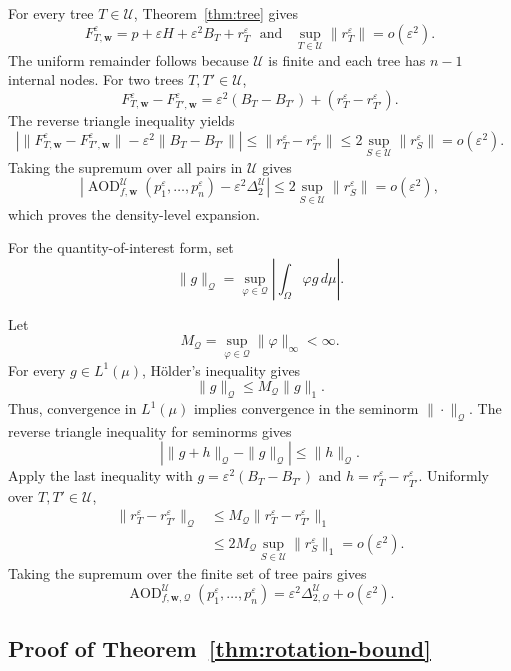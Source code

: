 \documentclass[11pt]{article}
\theoremstyle{plain}
\theoremstyle{definition}
\theoremstyle{definition}
\newcommand{\AOD}{\operatorname{AOD}}
\newcommand{\eps}{\varepsilon}
\newcommand{\QoI}{\mathcal Q}
\newcommand{\wv}{\mathbf w}
\newcommand{\Fw}[1]{F_{#1,\wv}^{\eps}}
\newcommand{\AODfw}{\AOD_{f,\wv}}
\newcommand{\AODfwQ}{\AOD_{f,\wv,\QoI}}
\begin{document}
For every tree $T\in\mathcal U$, Theorem~\ref{thm:tree} gives
\[
\Fw{T}=p+\eps H+\eps^2B_T+r_T^\eps \,\,\,\,\text{and}\,\,\,\,\,
\sup_{T\in\mathcal U}\|r_T^\eps\|=o(\eps^2).
\]
The uniform remainder follows because $\mathcal U$ is finite and each tree has $n-1$ internal nodes. For two trees $T,T'\in\mathcal U$,
\[
\Fw{T}-\Fw{T'}=\eps^2(B_T-B_{T'})+(r_T^\eps-r_{T'}^\eps).
\]
The reverse triangle inequality yields
\[
\left|\|\Fw{T}-\Fw{T'}\|-\eps^2\|B_T-B_{T'}\|\right|
\le \|r_T^\eps-r_{T'}^\eps\|
\le 2\sup_{S\in\mathcal U}\|r_S^\eps\|=o(\eps^2).
\]
Taking the supremum over all pairs in $\mathcal U$ gives
\[
\left|\AODfw^{\mathcal U}(p_1^\eps,\ldots,p_n^\eps)-\eps^2\Delta_2^{\mathcal U}\right|
\le 2\sup_{S\in\mathcal U}\|r_S^\eps\|=o(\eps^2),
\]
which proves the density-level expansion.

For the quantity-of-interest form, set
\[
\|g\|_{\QoI}=\sup_{\varphi\in\QoI}\left|\int_\Omega\varphi g\,d\mu\right|.
\]

Let
\[
M_{\QoI}=\sup_{\varphi\in\QoI}\|\varphi\|_\infty<\infty.
\]
For every $g\in L^1(\mu)$, H\"older's inequality gives
\[
\|g\|_{\QoI}
\le M_{\QoI}\|g\|_1.
\]
Thus, convergence in $L^1(\mu)$ implies convergence in the seminorm $\|\cdot\|_{\QoI}$. The reverse triangle inequality for seminorms gives
\[
\left|\|g+h\|_{\QoI}-\|g\|_{\QoI}\right|\le \|h\|_{\QoI}.
\]
Apply the last inequality with $g=\eps^2(B_T-B_{T'})$ and $h=r_T^\eps-r_{T'}^\eps$. Uniformly over $T,T'\in\mathcal U$,
\[
\begin{aligned}
\|r_T^\eps-r_{T'}^\eps\|_{\QoI}
&\le M_{\QoI}\|r_T^\eps-r_{T'}^\eps\|_1\\
&\le 2M_{\QoI}\sup_{S\in\mathcal U}\|r_S^\eps\|_1
=o(\eps^2).
\end{aligned}
\]
Taking the supremum over the finite set of tree pairs gives
\[
\AODfwQ^{\mathcal U}(p_1^\eps,\ldots,p_n^\eps)=\eps^2\Delta_{2,\QoI}^{\mathcal U}+o(\eps^2).
\]


\subsection{Proof of Theorem~\ref{thm:rotation-bound}}
\end{document}
